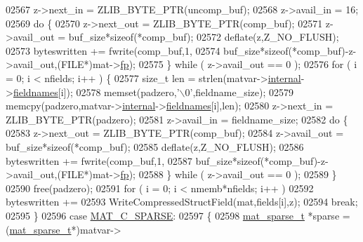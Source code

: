 \begin{DoxyCode}
{{{{{{{{{{{{{{{{02567             z->next\_in  = ZLIB\_BYTE\_PTR(uncomp\_buf);
02568             z->avail\_in = 16;
02569             \textcolor{keywordflow}{do} \{
02570                 z->next\_out  = ZLIB\_BYTE\_PTR(comp\_buf);
02571                 z->avail\_out = buf\_size*\textcolor{keyword}{sizeof}(*comp\_buf);
02572                 deflate(z,Z\_NO\_FLUSH);
02573                 byteswritten += fwrite(comp\_buf,1,
02574                     buf\_size*\textcolor{keyword}{sizeof}(*comp\_buf)-z->avail\_out,(FILE*)mat->\hyperlink{struct__mat__t_a85f562e407ca9ad4d2a6e14f839432b7}{fp});
02575             \} \textcolor{keywordflow}{while} ( z->avail\_out == 0 );
02576             \textcolor{keywordflow}{for} ( i = 0; i < nfields; i++ ) \{
02577                 \textcolor{keywordtype}{size\_t} len = strlen(matvar->\hyperlink{group___m_a_t_a6e97e3ed9f40c49322c18561c2a94e92}{internal}->\hyperlink{structmatvar__internal_a7574d000bfc98ad4860ae6590b8d4985}{fieldnames}[i]);
02578                 memset(padzero,\textcolor{charliteral}{'\(\backslash\)0'},fieldname\_size);
02579                 memcpy(padzero,matvar->\hyperlink{group___m_a_t_a6e97e3ed9f40c49322c18561c2a94e92}{internal}->\hyperlink{structmatvar__internal_a7574d000bfc98ad4860ae6590b8d4985}{fieldnames}[i],len);
02580                 z->next\_in  = ZLIB\_BYTE\_PTR(padzero);
02581                 z->avail\_in = fieldname\_size;
02582                 \textcolor{keywordflow}{do} \{
02583                     z->next\_out  = ZLIB\_BYTE\_PTR(comp\_buf);
02584                     z->avail\_out = buf\_size*\textcolor{keyword}{sizeof}(*comp\_buf);
02585                     deflate(z,Z\_NO\_FLUSH);
02586                     byteswritten += fwrite(comp\_buf,1,
02587                         buf\_size*\textcolor{keyword}{sizeof}(*comp\_buf)-z->avail\_out,(FILE*)mat->\hyperlink{struct__mat__t_a85f562e407ca9ad4d2a6e14f839432b7}{fp});
02588                 \} \textcolor{keywordflow}{while} ( z->avail\_out == 0 );
02589             \}
02590             free(padzero);
02591             \textcolor{keywordflow}{for} ( i = 0; i < nmemb*nfields; i++ )
02592                 byteswritten +=
02593                     WriteCompressedStructField(mat,fields[i],z);
02594             \textcolor{keywordflow}{break};
02595         \}
02596         \textcolor{keywordflow}{case} \hyperlink{group___m_a_t_ggad4d60ae7b709fc81bfd744fb4c857c40a0d5655b7e6178a2242cb3bb56ff4c8d2}{MAT\_C\_SPARSE}:
02597         \{
02598             \hyperlink{group___m_a_t_structmat__sparse__t}{mat\_sparse\_t} *sparse = (\hyperlink{group___m_a_t_structmat__sparse__t}{mat\_sparse\_t}*)matvar->
}}}}}}}}}}}}}}}}
\end{DoxyCode}
